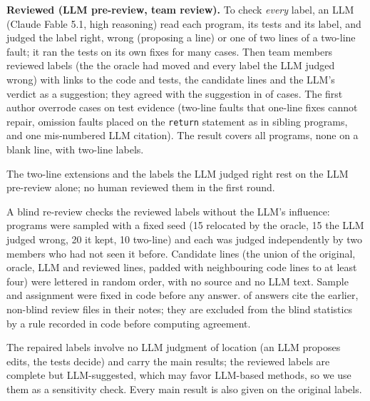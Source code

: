 \textbf{Reviewed (LLM pre-review, team review).} To check \emph{every} label, an LLM (Claude Fable 5.1, high reasoning)
read each program, its tests and its label, and judged the label right, wrong (proposing a line) or one of two lines of
a two-line fault; it ran the tests on its own fixes for many cases. Then \ReviewReviewersN{} team members reviewed
\ReviewHumanN{} labels (the \GtCorrectedN{} the oracle had moved and every label the LLM judged wrong) with links to the
code and tests, the candidate lines and the LLM's verdict as a suggestion; they agreed with the suggestion in
\ReviewAgreeN{} of \ReviewHumanN{} cases. The first author overrode \ReviewOverrideN{} cases on test evidence (two-line
faults that one-line fixes cannot repair, omission faults placed on the \texttt{return} statement as in sibling programs,
and one mis-numbered LLM citation). The result covers all \LabaudAllN{} programs, none on a blank line, with
\LabaudAllTwoLine{} two-line labels.

The \LabaudAllExtended{} two-line extensions and the labels the LLM judged right rest on the LLM pre-review alone; no human
reviewed them in the first round.

A blind re-review checks the reviewed labels without the LLM's influence: \BlindBlindAllPrograms{} programs were
sampled with a fixed seed (15 relocated by the oracle, 15 the LLM judged wrong, 20 it kept, 10 two-line) and each was
judged independently by two members who had not seen it before. Candidate lines (the union of the original, oracle, LLM
and reviewed lines, padded with neighbouring code lines to at least four) were lettered in random order, with no source and
no LLM text. Sample and assignment were fixed in code before any answer. \BlindAnswersExcluded{} of \BlindAnswersTotal{}
answers cite the earlier, non-blind review files in their notes; they are excluded from the blind statistics by a rule
recorded in code before computing agreement.

The repaired labels involve no LLM judgment of location (an LLM proposes edits, the tests decide) and carry
the main results; the reviewed labels are complete but
LLM-suggested, which may favor LLM-based methods, so we use them as a sensitivity check. Every main result is also given on
the original labels.

